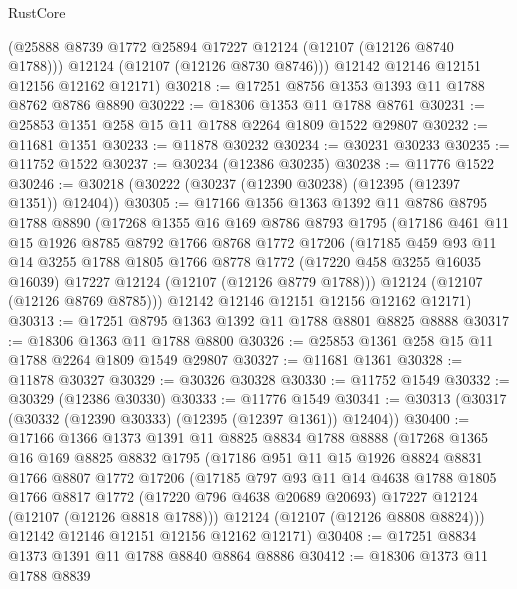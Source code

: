 \begin{lexlean}{RustCore}
\begin{coremodule}
        (@25888 @8739 @1772 @25894 @17227 @12124 (@12107 (@12126 @8740 @1788)))
        @12124
        (@12107 (@12126 @8730 @8746)))
      @12142
      @12146
      @12151
      @12156
      @12162
      @12171)
@30218 := @17251 @8756 @1353 @1393 @11 @1788 @8762 @8786 @8890
@30222 := @18306 @1353 @11 @1788 @8761
@30231 := @25853 @1351 @258 @15 @11 @1788 @2264 @1809 @1522 @29807
@30232 := @11681 @1351
@30233 := @11878 @30232
@30234 := @30231 @30233
@30235 := @11752 @1522
@30237 := @30234 (@12386 @30235)
@30238 := @11776 @1522
@30246 := @30218 (@30222 (@30237 (@12390 @30238) (@12395 (@12397 @1351)) @12404))
@30305 := @17166
    @1356
    @1363
    @1392
    @11
    @8786
    @8795
    @1788
    @8890
    (@17268
      @1355
      @16
      @169
      @8786
      @8793
      @1795
      (@17186
        @461
        @11
        @15
        @1926
        @8785
        @8792
        @1766
        @8768
        @1772
        @17206
        (@17185
          @459
          @93
          @11
          @14
          @3255
          @1788
          @1805
          @1766
          @8778
          @1772
          (@17220 @458 @3255 @16035 @16039)
          @17227
          @12124
          (@12107 (@12126 @8779 @1788)))
        @12124
        (@12107 (@12126 @8769 @8785)))
      @12142
      @12146
      @12151
      @12156
      @12162
      @12171)
@30313 := @17251 @8795 @1363 @1392 @11 @1788 @8801 @8825 @8888
@30317 := @18306 @1363 @11 @1788 @8800
@30326 := @25853 @1361 @258 @15 @11 @1788 @2264 @1809 @1549 @29807
@30327 := @11681 @1361
@30328 := @11878 @30327
@30329 := @30326 @30328
@30330 := @11752 @1549
@30332 := @30329 (@12386 @30330)
@30333 := @11776 @1549
@30341 := @30313 (@30317 (@30332 (@12390 @30333) (@12395 (@12397 @1361)) @12404))
@30400 := @17166
    @1366
    @1373
    @1391
    @11
    @8825
    @8834
    @1788
    @8888
    (@17268
      @1365
      @16
      @169
      @8825
      @8832
      @1795
      (@17186
        @951
        @11
        @15
        @1926
        @8824
        @8831
        @1766
        @8807
        @1772
        @17206
        (@17185
          @797
          @93
          @11
          @14
          @4638
          @1788
          @1805
          @1766
          @8817
          @1772
          (@17220 @796 @4638 @20689 @20693)
          @17227
          @12124
          (@12107 (@12126 @8818 @1788)))
        @12124
        (@12107 (@12126 @8808 @8824)))
      @12142
      @12146
      @12151
      @12156
      @12162
      @12171)
@30408 := @17251 @8834 @1373 @1391 @11 @1788 @8840 @8864 @8886
@30412 := @18306 @1373 @11 @1788 @8839

\end{coremodule}
\end{lexlean}
